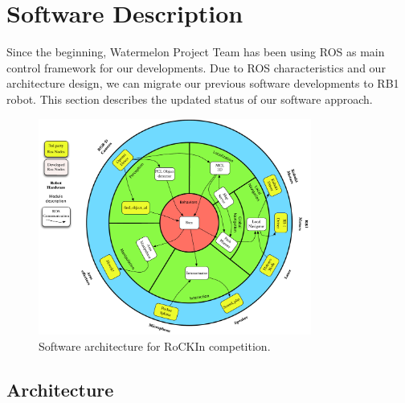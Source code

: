 \documentclass[conference]{IEEEtran}
\begin{document}
\section{Software Description}
\label{sec:softwaredescription}

Since the beginning, Watermelon Project Team has been using ROS as main control framework for our developments. 
Due to ROS characteristics and our architecture design, we can migrate our previous software developments to RB1 robot.
This section describes the updated status of our software approach. 



\begin{figure}[ht]
  \centering
  \includegraphics[width=0.8\textwidth]{rokinarq-142}
  \caption{Software architecture for RoCKIn competition.} 
  \label{fig:architecture}
\end{figure}

\subsection{Architecture}
\end{document}
